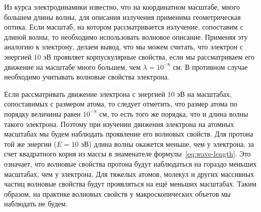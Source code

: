 \documentclass[a4paper, 12pt]{article}
\begin{document}
Из курса электродинамики известно, что на координатном масштабе, много большем
длины волны, для описания излучения применима геометрическая оптика. Если
масштаб, на котором рассматривается излучение, сопоставим с длиной волны, то
необходимо использовать волновое описание. Применяя эту аналогию к электрону,
делаем вывод, что мы можем считать, что электрон с энергией $10\text{ эВ}$
проявляет корпускулярные свойства, если мы рассматриваем его движение на
масштабе много большем, чем $\lambda=10^{-8}\text{ см}$. В противном случае необходимо
учитывать волновые свойства электрона.

Если рассматривать движение электрона с энергией $10\text{ эВ}$ на масштабах,
сопоставимых с размером атома, то следует отметить, что размер атома по порядку
величины равен $10^{-8}\text{ см}$, то есть того же порядка, что и длина волны
такого электрона. Поэтому при изучении движения электрона на атомных масштабах
мы будем наблюдать проявление его волновых свойств. Для протона той же энергии
($E=10\text{ эВ}$) длина волны окажется меньше, чем у электрона, за счет
квадратного корня из массы в знаменателе формулы~\eqref{eq:wave-length}. Это
означает, что волновые свойства протона будут наблюдаться на гораздо меньших
масштабах, чем у электрона. Для тяжелых атомов, молекул и других массивных
частиц волновые свойства будут проявляться на ещё меньших масштабах. Таким образом, на
практике волновых свойств у макроскопических объетов мы наблюдать не будем.

\printbibliography
\end{document}
